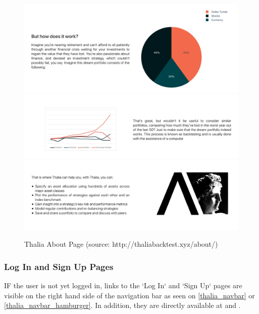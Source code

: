 \documentclass[main.tex]{subfiles}
\begin{document}
\begin{figure}[H]
   \centering
   \includegraphics[width=\textwidth,keepaspectratio]{08Appendices/081User/081Pictures/about_1.png}
   \includegraphics[width=\textwidth,keepaspectratio]{08Appendices/081User/081Pictures/about_2.png}
   \includegraphics[width=\textwidth,keepaspectratio]{08Appendices/081User/081Pictures/about_3.png}
   \caption{Thalia About Page (source: http://thaliabacktest.xyz/about/)}
   \label{thalia_about}
\end{figure}

\subsubsection{Log In and Sign Up Pages}
IF the user is not yet logged in, links to the `Log In` and `Sign Up` pages are visible on the right hand side of the navigation bar as seen on \figurename{\ref{thalia_navbar}} or \figurename{\ref{thalia_navbar_hamburger}}. In addition, they are directly available at  and .
\end{document}
